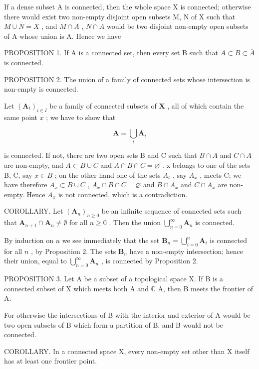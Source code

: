 If a dense subset A is connected, then the whole space X is connected; otherwise there would exist two non-empty disjoint open subsets M, N of X such that \(M \cup N = X\) , and \(M \cap A\) , \(N \cap A\) would be two disjoint non-empty open subsets of A whose union is A. Hence we have

PROPOSITION 1. If A is a connected set, then every set B such that \(A \subset B \subset \overline{A}\) is connected.

PROPOSITION 2. The union of a family of connected sets whose intersection is non-empty is connected.

Let \((\mathbf{A}_t)_{i\in I}\) be a family of connected subsets of \(\mathbf{X}\) , all of which contain the same point \(x\) ; we have to show that

\[
\mathbf {A} = \bigcup_ {i} \mathbf {A} _ {i}
\]

is connected. If not, there are two open sets B and C such that \(B \cap A\) and \(C \cap A\) are non-empty, and \(A \subset B \cup C\) and \(A \cap B \cap C = \varnothing\) . x belongs to one of the sets B, C, say \(x \in B\) ; on the other hand one of the sets \(A_t\) , say \(A_x\) , meets C; we have therefore \(A_x \subset B \cup C\) , \(A_x \cap B \cap C = \varnothing\) and \(B \cap A_x\) and \(C \cap A_x\) are non-empty. Hence \(A_x\) is not connected, which is a contradiction.

COROLLARY. Let \((\mathbf{A}_n)_{n\geqslant 0}\) be an infinite sequence of connected sets such that \(\mathbf{A}_{n + 1}\cap \mathbf{A}_n\neq \emptyset\) for all \(n\geqslant 0\) . Then the union \(\bigcup_{n = 0}^{\infty}\mathbf{A}_n\) is connected.

By induction on \(n\) we see immediately that the set \(\mathbf{B}_n = \bigcup_{i=0}^n \mathbf{A}_i\) is connected for all \(n\) , by Proposition 2. The sets \(\mathbf{B}_n\) have a non-empty intersection; hence their union, equal to \(\bigcup_{n=0}^{\infty} \mathbf{A}_n\) , is connected by Proposition 2.

PROPOSITION 3. Let A be a subset of a topological space X. If B is a connected subset of X which meets both A and \(\mathbb{C}\) A, then B meets the frontier of A.

For otherwise the intersections of B with the interior and exterior of A would be two open subsets of B which form a partition of B, and B would not be connected.

COROLLARY. In a connected space X, every non-empty set other than X itself has at least one frontier point.

